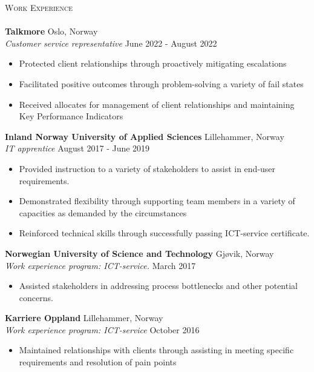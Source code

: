 \documentclass[a4paper]{article}
\newcommand{\lineunder} {
    \vspace*{-8pt} \\
    \hspace*{-18pt} \hrulefill \\
}
\newcommand{\header} [1] {
    {\hspace*{-18pt}\vspace*{6pt} \textsc{#1}}
    \vspace*{-6pt} \lineunder
}
\begin{document}
\header{Work Experience}
\vspace{1mm}
\textbf{Talkmore} \hfill Oslo, Norway\\
\textit{Customer service representative} \hfill June 2022 - August 2022\\
\vspace{-1mm}
\begin{itemize} \itemsep 1pt
	\item Protected client relationships through proactively mitigating escalations 
	\item Facilitated positive outcomes through problem-solving a variety of fail states  
    \item Received allocates for management of client relationships and maintaining Key Performance Indicators   
\end{itemize}
\textbf{Inland Norway
University of Applied Sciences} \hfill Lillehammer, Norway\\
\textit{IT apprentice} \hfill August 2017 - June 2019\\
\vspace{-1mm}
\begin{itemize} \itemsep 1pt
	\item Provided instruction to a variety of stakeholders to assist in end-user requirements. 
	\item Demonstrated flexibility through supporting team members in a variety of capacities as demanded by the circumstances
	\item Reinforced technical skills through successfully passing ICT-service certificate.
\end{itemize}
\textbf{Norwegian University of Science and Technology} \hfill Gjøvik, Norway\\
\textit{Work experience program: ICT-service.} \hfill March 2017\\
\vspace{-1mm}
\begin{itemize} \itemsep 1pt
	\item Assisted stakeholders in addressing process bottlenecks and other potential concerns. 
\end{itemize}
\textbf{Karriere Oppland} \hfill Lillehammer, Norway\\
\textit{Work experience program: ICT-service} \hfill October 2016\\
\begin{itemize} \itemsep 1pt
	\item Maintained relationships with clients through assisting in meeting specific requirements and resolution of pain points 
\end{itemize}
\end{document}
